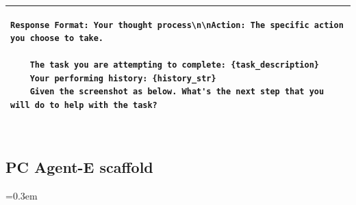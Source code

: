 \documentclass{article} %
\begin{document}
\begin{table}[!t]
\begin{tabular}{>{\setlength{\parskip}{0.2em}}p{}}
\begin{lstlisting}[basicstyle=\ttfamily\small]
    Response Format: Your thought process\n\nAction: The specific action you choose to take.

    The task you are attempting to complete: {task_description}
    Your performing history: {history_str}
    Given the screenshot as below. What's the next step that you will do to help with the task?
  
    \end{lstlisting} \\
    \bottomrule
    \end{tabular}
    \end{table}


\newpage
\subsection{PC Agent-E scaffold}
\label{appendix: scaffold}


\setlength{\parindent}{0pt}

\spaceskip=0.3em
\end{document}
